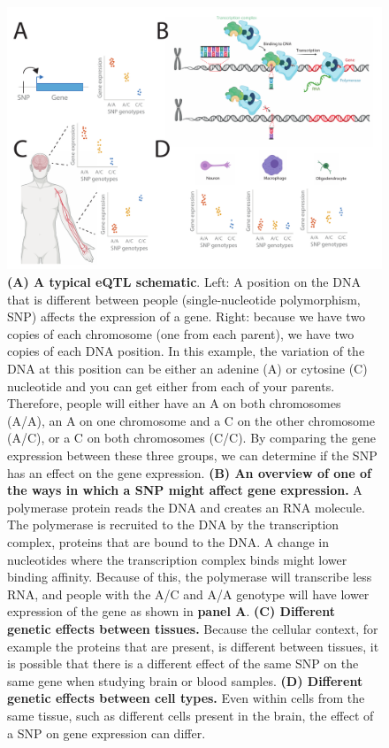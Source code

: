 \begin{figure}[H]
	\includegraphics[width=\textwidth]{chapters/chapter1-introduction/img/2021-03-07-fig1.pdf}
	\caption{\textbf{(A) A typical eQTL schematic}. Left:  A position on the DNA that is different between people (single-nucleotide polymorphism, SNP)  affects the expression of a gene. Right: because we have two copies of each chromosome (one from each parent), we have two copies of each DNA position. In this example, the variation of the DNA at this position can be either an adenine (A) or cytosine (C) nucleotide and you can get either from each of your parents. Therefore, people will either have an A on both chromosomes (A/A), an A on one chromosome and a C on the other chromosome (A/C), or a C on both chromosomes (C/C). By comparing the gene expression between these three groups, we can determine if the SNP has an effect on the gene expression. \textbf{(B) An overview of one of the ways in which a SNP might affect gene expression.} A polymerase protein reads the DNA and creates an RNA molecule. The polymerase is recruited to the DNA by the transcription complex, proteins that are bound to the DNA. A change in nucleotides where the transcription complex binds might lower binding affinity. Because of this, the polymerase will transcribe less RNA, and people with the A/C and A/A genotype will have lower expression of the gene as shown in \textbf{panel A}. \textbf{(C) Different genetic effects between tissues.} Because the cellular context, for example the proteins that are present, is different between tissues, it is possible that there is a different effect of the same SNP on the same gene when studying brain or blood samples. \textbf{(D) Different genetic effects between cell types.} Even within cells from the same tissue, such as different cells present in the brain, the effect of a SNP on gene expression can differ.}
	\label{introduction_fig1}
\end{figure}


